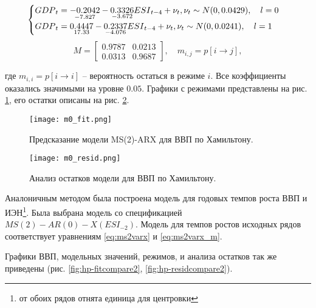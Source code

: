 \documentclass[../report.tex]{subfiles}
\begin{document}
	{

		\begin{equation}
			\label{eq:msvarx}
			\begin{cases}
				{GDP}_{t} = 
					\underset{-7.827}{-0.2042} 
					- \underset{-3.672}{0.3326} {ESI}_{t-4}
					+ \nu_{t} , \space \nu_{t} \sim N(0, 0.0429)
					, \quad l=0 \\
				{GDP}_{t} = 
					\underset{17.33}{0.4447}
					- \underset{-4.076}{0.2337} {ESI}_{t-4}
					+ \nu_{t} , \space \nu_{t} \sim N(0, 0.0241)
					, \quad l=1
			\end{cases}			
		\end{equation}
		\begin{equation}
			\label{eq:msvarx_m}
			M = 
				\begin{bmatrix}
				0.9787 & 0.0213 \\
				0.0313 & 0.9687
				\end{bmatrix}
			, \quad m_{i,j} = p[i \rightarrow j],
		\end{equation}
	
	}
	
	где $m_{i,i} = p[i \rightarrow i]$ – вероятность остаться в режиме $i$. Все коэффициенты оказались значимыми на уровне $0.05$. Графики с режимами представлены на рис. \ref{fig:hp-fitcompare}, его остатки описаны на рис. \ref{fig:hp-residcomp}.
	
	{
		\begin{figure}
			\texttt{[image: m0\_fit.png]}
			\caption{Предсказание модели MS(2)-ARX для ВВП по Хамильтону.}
			\label{fig:hp-fitcompare}
		\end{figure}
		\begin{figure}
			\texttt{[image: m0\_resid.png]}
			\caption{Анализ остатков модели для ВВП по Хамильтону.}
			\label{fig:hp-residcomp}
		\end{figure}
	}
	
	
	Аналоничным методом была построена модель для годовых темпов роста ВВП и ИЭН\footnote{от обоих рядов отнята единица для центровки}. Была выбрана модель со спецификацией $MS(2)-AR(0)-X({ESI}_{-2})$. Модель для темпов ростов исходных рядов соответствует уравнениям \ref{eq:ms2varx} и \ref{eq:ms2varx_m}.
	
	Графики ВВП, модельных значений, режимов, и анализа остатков так же приведены (рис. \ref{fig:hp-fitcompare2}, \ref{fig:hp-residcompare2}).
	
\end{document}
